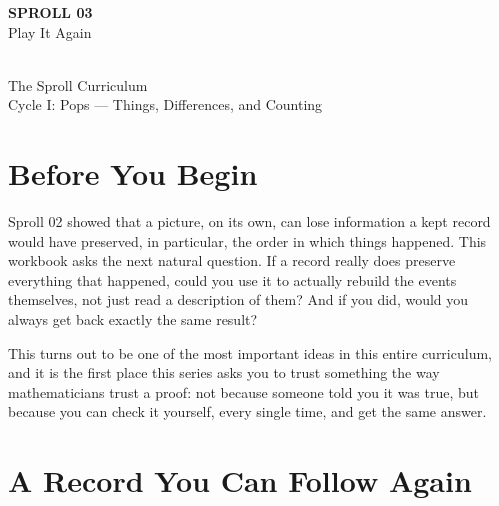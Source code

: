 \documentclass[11pt]{book}
\begin{document}
\begin{titlepage}
\centering
\vspace*{1.4in}
{\Huge \textbf{SPROLL 03}}\\[0.5in]
{\huge Play It Again}\\[0.8in]
\\[0.5in]
{\Large The Sproll Curriculum}\\[0.2in]
{\large Cycle I: Pops --- Things, Differences, and Counting}
\end{titlepage}

\tableofcontents

\chapter*{Before You Begin}

Sproll 02 showed that a picture, on its own, can lose information a kept record would have preserved, in particular, the order in which things happened. This workbook asks the next natural question. If a record really does preserve everything that happened, could you use it to actually rebuild the events themselves, not just read a description of them? And if you did, would you always get back exactly the same result?

This turns out to be one of the most important ideas in this entire curriculum, and it is the first place this series asks you to trust something the way mathematicians trust a proof: not because someone told you it was true, but because you can check it yourself, every single time, and get the same answer.

\chapter{A Record You Can Follow Again}
\end{document}
